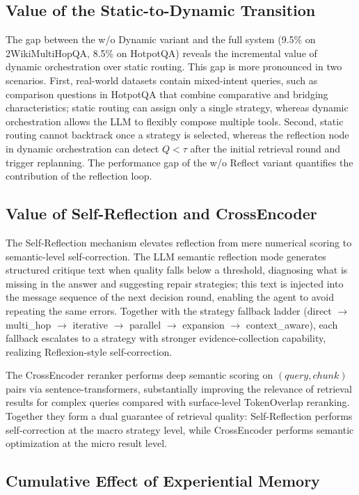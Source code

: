 \documentclass[runningheads]{llncs}
\begin{document}
\subsection{Value of the Static-to-Dynamic Transition}

The gap between the w/o Dynamic variant and the full system (9.5\% on 2WikiMultiHopQA, 8.5\% on HotpotQA) reveals the incremental value of dynamic orchestration over static routing. This gap is more pronounced in two scenarios. First, real-world datasets contain mixed-intent queries, such as comparison questions in HotpotQA that combine comparative and bridging characteristics; static routing can assign only a single strategy, whereas dynamic orchestration allows the LLM to flexibly compose multiple tools. Second, static routing cannot backtrack once a strategy is selected, whereas the reflection node in dynamic orchestration can detect $Q < \tau$ after the initial retrieval round and trigger replanning. The performance gap of the w/o Reflect variant quantifies the contribution of the reflection loop.

\subsection{Value of Self-Reflection and CrossEncoder}

The Self-Reflection mechanism elevates reflection from mere numerical scoring to semantic-level self-correction. The LLM semantic reflection mode generates structured critique text when quality falls below a threshold, diagnosing what is missing in the answer and suggesting repair strategies; this text is injected into the message sequence of the next decision round, enabling the agent to avoid repeating the same errors. Together with the strategy fallback ladder (direct $\to$ multi\_hop $\to$ iterative $\to$ parallel $\to$ expansion $\to$ context\_aware), each fallback escalates to a strategy with stronger evidence-collection capability, realizing Reflexion-style self-correction.

The CrossEncoder reranker performs deep semantic scoring on $(query, chunk)$ pairs via sentence-transformers, substantially improving the relevance of retrieval results for complex queries compared with surface-level TokenOverlap reranking. Together they form a dual guarantee of retrieval quality: Self-Reflection performs self-correction at the macro strategy level, while CrossEncoder performs semantic optimization at the micro result level.

\subsection{Cumulative Effect of Experiential Memory}
\end{document}

